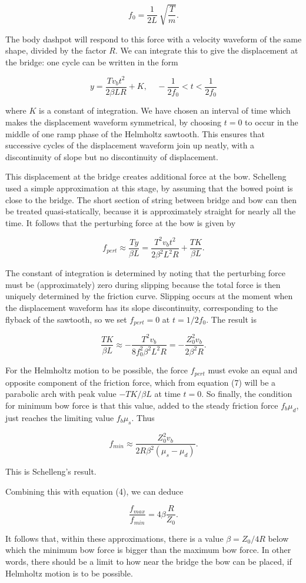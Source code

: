   $$f_0=\dfrac{1}{2L}~\sqrt{\dfrac{T}{m}} . \tag{5}$$ 

  The body dashpot will respond to this force with a velocity waveform of the 
  same shape, divided by the factor $R$. We can integrate this to give the 
  displacement at the bridge: one cycle can be written in the form 

  $$y=\dfrac{T v_b t^2}{2 \beta L R} + K, \mathrm{~~~~~}-\dfrac{1}{2f_0} < t < 
  \dfrac{1}{2f_0} \tag{6}$$ 

  where $K$ is a constant of integration. We have chosen an interval of time 
  which makes the displacement waveform symmetrical, by choosing $t=0$ to occur 
  in the middle of one ramp phase of the Helmholtz sawtooth. This ensures that 
  successive cycles of the displacement waveform join up neatly, with a 
  discontinuity of slope but no discontinuity of displacement. 

  This displacement at the bridge creates additional force at the bow. 
  Schelleng used a simple approximation at this stage, by assuming that the 
  bowed point is close to the bridge. The short section of string between 
  bridge and bow can then be treated quasi-statically, because it is 
  approximately straight for nearly all the time. It follows that the 
  perturbing force at the bow is given by 

  $$f_{pert} \approx \dfrac{Ty}{\beta L} = \dfrac{T^2 v_b t^2}{2 \beta^2 L^2 R} 
  + \dfrac{TK}{\beta L} . \tag{7}$$ 

  The constant of integration is determined by noting that the perturbing force 
  must be (approximately) zero during slipping because the total force is then 
  uniquely determined by the friction curve. Slipping occurs at the moment when 
  the displacement waveform has its slope discontinuity, corresponding to the 
  flyback of the sawtooth, so we set $f_{pert}=0$ at $t=1/2f_0$. The result is 

  $$\dfrac{TK}{\beta L} \approx -\dfrac{T^2 v_b}{8f_0^2 \beta^2 L^2 R}= 
  -\dfrac{Z_0^2 v_b}{2 \beta^2 R} . \tag{8} $$ 

  For the Helmholtz motion to be possible, the force $f_{pert}$ must evoke an 
  equal and opposite component of the friction force, which from equation (7) 
  will be a parabolic arch with peak value $-TK/\beta L$ at time $t=0$. So 
  finally, the condition for minimum bow force is that this value, added to the 
  steady friction force $f_b \mu_d$, just reaches the limiting value $f_b 
  \mu_s$. Thus 

  $$f_{min} \approx \dfrac{Z_0^2 v_b}{2 R \beta^2 (\mu_s-\mu_d)} . \tag{9}$$ 

  This is Schelleng's result. 

  Combining this with equation (4), we can deduce 

  $$\dfrac{f_{max}}{f_{min}}=4 \beta \dfrac{R}{Z_0} . \tag{10}$$ 

  It follows that, within these approximations, there is a value $\beta=Z_0/4R$ 
  below which the minimum bow force is bigger than the maximum bow force. In 
  other words, there should be a limit to how near the bridge the bow can be 
  placed, if Helmholtz motion is to be possible. 
